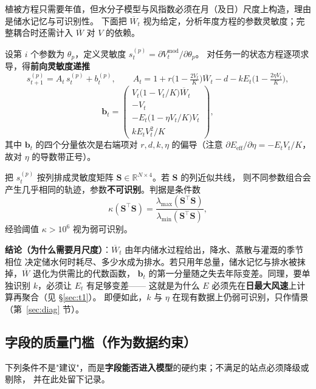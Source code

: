 \documentclass[11pt,a4paper]{ctexart}
\newcommand{\R}{\mathbb{R}}
\begin{document}
植被方程只需要年值，但水分子模型与风指数必须在月（及日）尺度上构造，理由是储水记忆与可识别性。
下面把 $\overline W_t$ 视为给定，分析年度方程的参数灵敏度；完整耦合时还需计入 $\overline W$ 对 $V$ 的依赖。

设第 $i$ 个参数为 $\theta_p$，定义灵敏度 $s_t^{(p)}=\partial V_t^{\mathrm{mod}}/\partial\theta_p$。
对任务一的状态方程逐项求导，得\textbf{前向灵敏度递推}
\begin{equation}\label{eq:sens}
s_{t+1}^{(p)}=A_t\,s_t^{(p)}+b_t^{(p)},\qquad
A_t=1+r\Big(1-\tfrac{2V_t}{K}\Big)\overline W_t-d-kE_t\Big(1-\tfrac{2\eta V_t}{K}\Big),
\end{equation}
\begin{equation}\label{eq:sensb}
\bm{b}_t=
\begin{pmatrix}
V_t\big(1-V_t/K\big)\overline W_t\\[2pt]
-V_t\\[2pt]
-E_t\big(1-\eta V_t/K\big)V_t\\[2pt]
kE_tV_t^{2}/K
\end{pmatrix},
\end{equation}
其中 $\bm{b}_t$ 的四个分量依次是右端项对 $r,d,k,\eta$ 的偏导（注意
$\partial E_{\mathrm{eff}}/\partial\eta=-E_tV_t/K$，故对 $\eta$ 的导数带正号）。

把 $s_t^{(p)}$ 按列排成灵敏度矩阵 $\bm{S}\in\R^{N\times4}$。若 $\bm{S}$ 的列近似共线，
则不同参数组合会产生几乎相同的轨迹，参数\textbf{不可识别}。判据是条件数
\begin{equation}\label{eq:cond}
\kappa(\bm{S}^{\top}\bm{S})=\frac{\lambda_{\max}(\bm{S}^{\top}\bm{S})}{\lambda_{\min}(\bm{S}^{\top}\bm{S})},
\end{equation}
经验阈值 $\kappa>10^{6}$ 视为弱可识别。

\textbf{结论（为什么需要月尺度）}：$\overline W_t$ 由年内储水过程给出，降水、蒸散与灌溉的季节相位
决定储水何时耗尽、多少水成为排水。若只用年总量，储水记忆与排水被抹掉，$\overline W$ 退化为供需比的代数函数，
$\bm{b}_t$ 的第一分量随之失去年际变差。同理，要单独识别 $k$，必须让 $E_t$ 有足够变差——
这就是为什么 $E$ 必须先在\textbf{日最大风速}上计算再聚合（见 \S\ref{sec:t1}）。
即便如此，$k$ 与 $\eta$ 在现有数据上仍弱可识别，只作情景（第~\ref{sec:diag} 节）。

\subsection{字段的质量门槛（作为数据约束）}

下列条件不是"建议"，而是\textbf{字段能否进入模型}的硬约束；不满足的站点必须降级或剔除，
并在此处留下记录。
\end{document}
